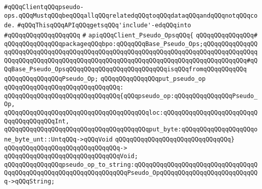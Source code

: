\newline
\newline
\newline
\newline
\verb|#qQQqClientqQQqpseudo-ops.qQQqMustqQQqbeqQQqallqQQqrelatedqQQqtoqQQqdataqQQqandqQQqnotqQQqcode.|\newline
\newline
\verb|#qQQqThisqQQqAPIqQQqgetsqQQq'include'-edqQQqinto|\newline
\verb|#qQQqqQQqqQQqqQQqqQQq|\newline
\verb|#|\newline
\verb|apiqQQqClient_Pseudo_OpsqQQq{|\newline
\verb|qQQqqQQqqQQqqQQq#|\newline
\verb|qQQqqQQqqQQqqQQqpackageqQQqbpo:qQQqqQQqBase_Pseudo_Ops;qQQqqQQqqQQqqQQqqQQqqQQqqQQqqQQqqQQqqQQqqQQqqQQqqQQqqQQqqQQqqQQqqQQqqQQqqQQqqQQqqQQqqQQqqQQqqQQqqQQqqQQqqQQqqQQqqQQqqQQqqQQqqQQqqQQqqQQqqQQqqQQqqQQqqQQq#qQQqBase_Pseudo_OpsqQQqqQQqqQQqqQQqqQQqqQQqqQQqisqQQqfromqQQqqQQqqQQq|\newline
\newline
\verb|qQQqqQQqqQQqqQQqPseudo_Op;|\newline
\newline
\verb|qQQqqQQqqQQqqQQqput_pseudo_op|\newline
\verb|qQQqqQQqqQQqqQQqqQQqqQQqqQQqqQQq:|\newline
\verb|qQQqqQQqqQQqqQQqqQQqqQQqqQQqqQQq{qQQqpseudo_op:qQQqqQQqqQQqqQQqPseudo_Op,|\newline
\verb|qQQqqQQqqQQqqQQqqQQqqQQqqQQqqQQqqQQqqQQqloc:qQQqqQQqqQQqqQQqqQQqqQQqqQQqqQQqqQQqqQQqInt,|\newline
\verb|qQQqqQQqqQQqqQQqqQQqqQQqqQQqqQQqqQQqqQQqput_byte:qQQqqQQqqQQqqQQqqQQqone_byte_unt::UntqQQq->qQQqVoid|\newline
\verb|qQQqqQQqqQQqqQQqqQQqqQQqqQQqqQQq}|\newline
\verb|qQQqqQQqqQQqqQQqqQQqqQQqqQQqqQQq->|\newline
\verb|qQQqqQQqqQQqqQQqqQQqqQQqqQQqqQQqVoid;|\newline
\newline
\verb|qQQqqQQqqQQqqQQqpseudo_op_to_string:qQQqqQQqqQQqqQQqqQQqqQQqqQQqqQQqqQQqqQQqqQQqqQQqqQQqqQQqqQQqqQQqqQQqPseudo_OpqQQqqQQqqQQqqQQqqQQqqQQqqQQq->qQQqString;|\newline
